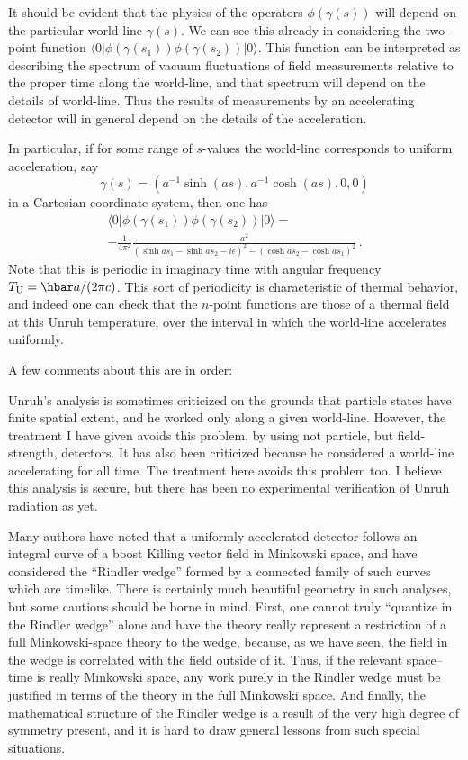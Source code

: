 \documentclass[12pt]{article}
\begin{document}
It should be evident that the physics of the operators $\phi (\gamma (s))$ will depend on the particular world-line $\gamma (s)$.  We can see this already in considering the two-point function
$\langle 0|\phi (\gamma (s_1))\phi (\gamma (s_2))|0\rangle$.
This function can be interpreted as describing the spectrum of vacuum fluctuations of field measurements relative to the proper time along the world-line, and that spectrum will depend on the details of world-line.   Thus the results of measurements by an accelerating detector will in general depend on the details of the acceleration.

In particular, if for some range of $s$-values the world-line corresponds to uniform acceleration, say
\begin{equation}
  \gamma (s) =(a^{-1}\sinh (as),a^{-1}\cosh (as),0,0) 
\end{equation}
in a Cartesian coordinate system, then one has
\begin{multline}
\langle 0|\phi (\gamma (s_1))\phi (\gamma (s_2))|0\rangle =\\
 -\frac{1}{4\pi^2}\frac{a^2}{(\sinh as_1-\sinh as_2 -i\epsilon )^2-(\cosh as_2-\cosh as_1)^2}\, .
\end{multline}
Note that this is periodic in imaginary time with angular frequency $T_{\rm U}=\hbar a/(2\pi c)$.  This sort of periodicity is characteristic of thermal behavior, and indeed one can check that the $n$-point functions are those of a thermal field at this Unruh temperature, over the interval in which the world-line accelerates uniformly.

A few comments about this are in order:

Unruh's analysis is sometimes criticized on the grounds that particle states have finite spatial extent, and he worked only along a given world-line.  However, the treatment I have given avoids this problem, by using not particle, but field-strength, detectors.  
It has also been criticized because he considered a world-line accelerating for all time.  The treatment here avoids this problem too.
I believe this analysis is secure, but there has been no experimental verification of Unruh radiation as yet.


Many authors have noted that a uniformly accelerated detector follows an integral curve of a boost Killing vector field in Minkowski space, and have considered the ``Rindler wedge'' formed by a connected family of such curves which are timelike.  There is certainly much beautiful geometry in such analyses, but some cautions should be borne in mind.  First, one cannot truly ``quantize in the Rindler wedge'' alone and have the theory really represent a restriction of a full Minkowski-space theory to the wedge, because, as we have seen, the field in the wedge is correlated with the field outside of it.  Thus, if the relevant space--time is really Minkowski space, any work purely in the Rindler wedge must be justified in terms of the theory in the full Minkowski space.  And finally, the mathematical structure of the Rindler wedge is a result of the very high degree of symmetry present, and it is hard to draw general lessons from such special situations.
\end{document}
